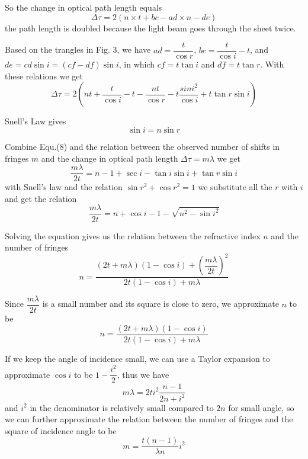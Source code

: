 \documentclass[12pt]{article}
\begin{document}
So the change in optical path length equals
\begin{equation}
	\Delta{\tau}=2(n\times{t}+bc-ad\times{n}-de)
\end{equation}
the path length is doubled because the light beam goes through the sheet twice.

Based on the trangles in Fig. 3, we have $ ad=\dfrac{t}{\cos{r}} $, $ bc= \dfrac{t}{\cos{i}}-t$, and $ de=cd\sin{i}=(cf-df)\sin{i}$, in which $cf=t\tan{i}$ and $df=t\tan{r}$. With these relations we get
\begin{equation}
	\Delta{\tau}=2(n{t}+\dfrac{t}{\cos{i}}-t-\dfrac{nt}{\cos{r}}-t\dfrac{sin{i}^{2}}{\cos{i}}+t\tan{r}\sin{i})
\end{equation}



Snell's Law gives
\begin{equation}
	\sin{i}=n\sin{r}
\end{equation}

Combine Equ.(8) and the relation between the observed number of shifts in fringes $m$ and the change in optical path length $\Delta{\tau}=m\lambda$ we get
\begin{equation}
\dfrac{m\lambda}{2t}=n-1+\sec{i}-\tan{i}\sin{i}+\tan{r}\sin{i}
\end{equation}
with Snell's law and the relation $\sin{r}^{2}+\cos{r}^{2}=1$ we substitute all the $r$ with $i$ and get the relation 
\begin{equation}
\dfrac{m\lambda}{2t}=n+\cos{i}-1-\sqrt{n^{2}-\sin{i}^{2}}
\end{equation}

Solving the equation gives us the relation between the refractive index $n$ and the number of fringes
\begin{equation}
	n=\dfrac{(2t+m\lambda)(1-\cos{i})+(\dfrac{m\lambda}{2t})^{2}}{2t(1-\cos{i})+m\lambda}
\end{equation}

Since $\dfrac{m\lambda}{2t}$ is a small number and its square is close to zero, we approximate $n$ to be 
\begin{equation}
n=\dfrac{(2t+m\lambda)(1-\cos{i})}{2t(1-\cos{i})+m\lambda}
\end{equation}

If we keep the angle of incidence small, we can use a Taylor expansion to approximate $\cos{i}$ to be $1-\dfrac{i^{2}}{2}$, thus we have
\begin{equation}
	m\lambda=2ti^{2}\dfrac{n-1}{2n+i^{2}}
\end{equation}
and $i^{2}$ in the denominator is relatively small compared to $2n$ for small angle, so we can further approximate the relation between the number of fringes and the square of incidence angle to be
\begin{equation}
	m=\dfrac{t(n-1)}{\lambda{n}}i^{2}
\end{equation} 
\end{document}
